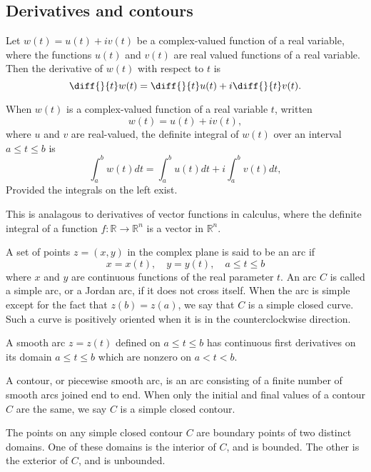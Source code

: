 \documentclass{article}
\begin{document}
\subsection{Derivatives and contours}
\begin{definition}[Derivative]
	Let \(w(t)=u(t)+iv(t)\) be a complex-valued function of a real variable, where the functions \(u(t)\) and \(v(t)\) are real valued functions of a real variable. Then the derivative of \(w(t)\) with respect to \(t\) is
	\begin{equation*}
		\diff{}{t}w(t)=\diff{}{t}u(t)+i\diff{}{t}v(t).
	\end{equation*}
\end{definition}
\begin{definition}
	When \(w(t)\) is a complex-valued function of a real variable \(t\), written
	\begin{equation*}
		w(t)=u(t)+iv(t),
	\end{equation*}
	where \(u\) and \(v\) are real-valued, the definite integral of \(w(t)\) over an interval \(a\leq t\leq b\) is
	\begin{equation*}
		\int_a^b w(t)dt=\int_a^b u(t)dt+i\int_a^b v(t)dt,
	\end{equation*}
	Provided the integrals on the left exist.
\end{definition}
\begin{remark}
	This is analagous to derivatives of vector functions in calculus, where the definite integral of a function \(f:\mathbb{R}\rightarrow\mathbb{R}^n\) is a vector in \(\mathbb{R}^n\).
\end{remark}
\begin{definition}[Arc]
	A set of points \(z=(x,y)\) in the complex plane is said to be an arc if
	\begin{equation*}
		x=x(t),\quad y=y(t),\quad a\leq t\leq b
	\end{equation*}
	where \(x\) and \(y\) are continuous functions of the real parameter \(t\). An arc \(C\) is called a simple arc, or a Jordan arc, if it does not cross itself. When the arc is simple except for the fact that \(z(b)=z(a)\), we say that \(C\) is a simple closed curve. Such a curve is positively oriented when it is in the counterclockwise direction.
\end{definition}
\begin{definition}
	A smooth arc \(z=z(t)\) defined on \(a\leq t\leq b\) has continuous first derivatives on its domain \(a\leq t\leq b\) which are nonzero on \(a<t<b\).
\end{definition}
\begin{definition}[Contour]
	A contour, or piecewise smooth arc, is an arc consisting of a finite number of smooth arcs joined end to end. When only the initial and final values of a contour \(C\) are the same, we say \(C\) is a simple closed contour.
\end{definition}
\begin{theorem}
	The points on any simple closed contour \(C\) are boundary points of two distinct domains. One of these domains is the interior of \(C\), and is bounded. The other is the exterior of \(C\), and is unbounded.
\end{theorem}
\end{document}
